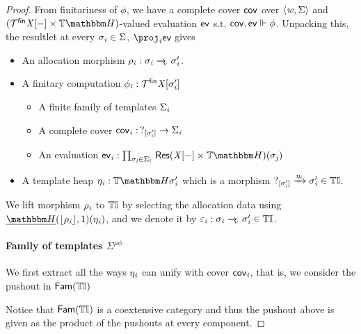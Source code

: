 \begin{proof}
    From finitariness of $\phi$, we have a complete cover $\mathsf{cov}$ over $\langle\mathit{w}, \Sigma\rangle$ and $(\monFLSFin\vX\anyL\dash \times \theapF)$-valued evaluation $\mathsf{ev}$ 
    s.t. $\mathsf{cov}, \mathsf{ev} \Vdash \phi$.
    Unpacking this, the resultlet at every $\sigma_{\mathit{i}} \in \Sigma$, $\proj_\vi \ev$ gives
    \begin{itemize}
        \item An allocation morphism $\rho_\vi : \sigma_\vi \ato \sigma_\vi'$.
        \item A finitary computation $\phi_{\mathit{i}} : \mathcal{T}^{\mathsf{fin}}\mathit{X}[\sigma_{\mathit{i}}']$
            \begin{itemize}
                \item A finite family of templates $\Sigma_{\mathit{i}}$
                \item A complete cover $\mathsf{cov}_{\mathit{i}} :\, ?_{[\sigma_{\mathit{i}}']} \to \Sigma_{\mathit{i}}$
                \item An evaluation $\ev_\vi : \Prod{\sigma_\vj \in \Sigma_\vi} \typeRes{(\vX\anyL\dash \times \theapF)}(\sigma_\vj)$
            \end{itemize}
        \item A template heap $\mvarM_\vi : \theapF{\sigma_\vi'}$ which is a morphism $?_{[\sigma_{\mathit{i}}']} \xrightarrow{\eta_{\mathit{i}}} \sigma_{\mathit{i}}' \in {\mathbb{T}\mathbb{I}}$.
    \end{itemize}
    We lift morphism $\rho_{\mathit{i}}$ to ${\mathbb{T}\mathbb{I}}$ by selecting the allocation data using $\dheapF(\concL{\rho_\vi}, 1)(\mvarM_\vi)$,
    and we denote it by $\me_\vi : \sigma_\vi \ato \sigma_\vi' \in \tinstC$.

    \paragraph{Family of templates $\Sigma^{\mu\phi}$}

    We first extract all the ways $\eta_{\mathit{i}}$ can unify with cover $\mathsf{cov}_{\mathit{i}}$, that is, we consider the pushout in $\mathsf{Fam}({{\mathbb{T}\mathbb{I}}})$
    \begin{center}
    \end{center}
    Notice that $\mathsf{Fam}({{\mathbb{T}\mathbb{I}}})$ is a coextensive category and thus the pushout above is given as the product of the pushouts at every component.


\end{proof}

